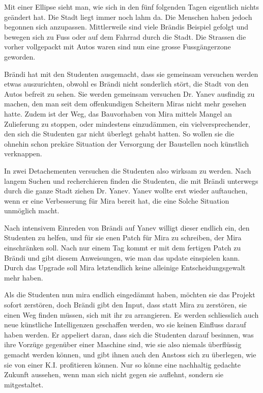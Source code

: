 \documentclass[11pt,a4paper,ngerman]{scrreprt}
\begin{document}
Mit einer Ellipse sieht man, wie sich in den fünf folgenden Tagen eigentlich
nichts geändert hat. Die Stadt liegt immer noch lahm da. Die Menschen haben
jedoch begonnen sich anzupassen. Mittlerweile sind viele Brändis Beispiel
gefolgt und bewegen sich zu Fuss oder auf dem Fahrrad durch die Stadt. Die
Strassen die vorher vollgepackt mit Autos waren sind nun eine grosse
Fussgängerzone geworden.

Brändi hat mit den Studenten ausgemacht, dass sie gemeinsam versuchen werden
etwas auszurichten, obwohl es Brändi nicht sonderlich stört, die Stadt von den
Autos befreit zu sehen. Sie werden gemeinsam versuchen Dr. Yanev ausfindig zu
machen, den man seit dem offenkundigen Scheitern Miras nicht mehr gesehen
hatte. Zudem ist der Weg, das Bauvorhaben von Mira mittels Mangel an Zulieferung
zu stoppen, oder mindestens einzudämmen, ein vielversprechender, den sich die
Studenten gar nicht überlegt gehabt hatten. So wollen sie die ohnehin schon
prekäre Situation der Versorgung der Baustellen noch künstlich verknappen.

In zwei Detachementen versuchen die Studenten also wirksam zu werden. Nach
langem Suchen und recherchieren finden die Studenten, die mit Brändi unterwegs
durch die ganze Stadt ziehen Dr. Yanev. Yanev wollte erst wieder auftauchen,
wenn er eine Verbesserung für Mira bereit hat, die eine Solche Situation
unmöglich macht.

Nach intensivem Einreden von Brändi auf Yanev willigt dieser endlich ein, den
Studenten zu helfen, und für sie enen Patch für Mira zu schreiben, der Mira
einschränken soll. Nach nur einem Tag kommt er mit dem fertigen Patch zu Brändi
und gibt diesem Anweisungen, wie man das update einspielen kann. Durch das
Upgrade soll Mira letztendlich keine alleinige Entscheidungsgewalt mehr haben.

Als die Studenten nun mira endlich eingedämmt haben, möchten sie das Projekt
sofort zerstören, doch Brändi gibt den Input, dass statt Mira zu zerstören, sie
einen Weg finden müssen, sich mit ihr zu arrangieren. Es werden schliesslich
auch neue künstliche Intelligenzen geschaffen werden, wo sie keinen Einfluss
darauf haben werden. Er appeliert daran, dass sich die Studenten darauf
besinnen, was ihre Vorzüge gegenüber einer Maschine sind, wie sie also niemals
überflüssig gemacht werden können, und gibt ihnen auch den Anstoss sich zu
überlegen, wie sie von einer K.I. profitieren können. Nur so könne eine
nachhaltig gedachte Zukunft aussehen, wenn man sich nicht gegen sie auflehnt,
sondern sie mitgestaltet.
\end{document}

